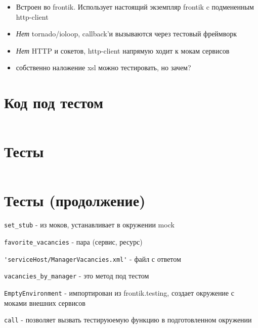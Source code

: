 \documentclass[12pt]{article}
\begin{document}
\begin{itemize}
\item Встроен во frontik. Использует настоящий экземпляр frontik c подмененным http-client
\item \emph{Нет} tornado/ioloop, callback'и вызываются через тестовый фреймворк
\item \emph{Нет} HTTP и сокетов, http-client напрямую ходит к мокам сервисов
\item собственно наложение xsl можно тестировать, но зачем?

\end{itemize}



\section{Код под тестом}
\small
\inputminted[linenos=true]{python}{code.py}

\section{Тесты}

\small
\inputminted[linenos=true]{python}{test.py}

\section{Тесты (продолжение)}
\verb+set_stub+ - из моков, устанавливает в окружении mock

\verb+favorite_vacancies+ - пара (сервис, ресурс)

\verb+'serviceHost/ManagerVacancies.xml'+ - файл с ответом

\verb+vacancies_by_manager+ - это метод под тестом

\verb+EmptyEnvironment+ - импортирован из frontik.testing, создает окружение с моками внешних сервисов

\verb+call+ - позволяет вызвать тестируюемую функцию в подготовленном окружении
\end{document}
